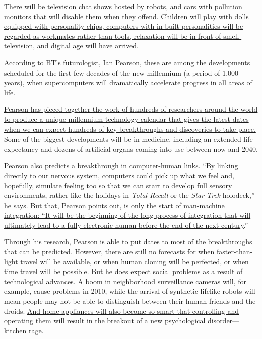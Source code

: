 \transnum \uline{There will be television chat shows hosted by robots, and
cars with pollution monitors that will disable them when they offend}.
\transnum \uline{Children will play with dolls equipped with personality
chips, computers with in-built personalities will be regarded as
workmates rather than tools, relaxation will be in front of smell-television, and digital age will have arrived.}

According to BT's futurologist, Ian Pearson, these are among the
developments scheduled for the first few decades of the new
millennium (a period of 1,000 years), when supercomputers will
dramatically accelerate progress in all areas of life.

\transnum \uline{Pearson has pieced together the work of hundreds of
researchers around the world to produce a unique millennium technology
calendar that gives the latest dates when we can expect hundreds of key
breakthroughs and discoveries to take place.} Some of the biggest
developments will be in medicine, including an extended life expectancy
and dozens of artificial organs coming into use between now and 2040.

Pearson also predicts a breakthrough in computer-human links. ``By
linking directly to our nervous system, computers could pick up what we
feel and, hopefully, simulate feeling too so that we can start to
develop full sensory environments, rather like the holidays in \emph{Total Recall} or the \emph{Star Trek} holodeck,'' he says. \transnum \uline{But that,
Pearson points out, is only the start of man-machine integration: ``It
will be the beginning of the long process of integration that will
ultimately lead to a fully electronic human before the end of the next
century}.''

Through his research, Pearson is able to put dates to most of the
breakthroughs that can be predicted. However, there are still no
forecasts for when faster-than-light travel will be available, or when
human cloning will be perfected, or when time travel will be possible.
But he does expect social problems as a result of technological
advances. A boom in neighborhood surveillance cameras will, for example,
cause problems in 2010, while the arrival of synthetic lifelike robots
will mean people may not be able to distinguish between their human
friends and the droids.
\transnum \uline{And home appliances will also become so smart that
controlling and operating them will result in the breakout of a new
psychological disorder---kitchen rage.}





